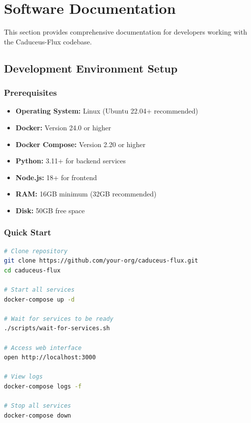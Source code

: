 \documentclass[10pt,a4paper]{article}
\begin{document}
\section{Software Documentation}

This section provides comprehensive documentation for developers working with the Caduceus-Flux codebase.

\subsection{Development Environment Setup}

\subsubsection{Prerequisites}
\begin{itemize}
\item \textbf{Operating System:} Linux (Ubuntu 22.04+ recommended)
\item \textbf{Docker:} Version 24.0 or higher
\item \textbf{Docker Compose:} Version 2.20 or higher
\item \textbf{Python:} 3.11+ for backend services
\item \textbf{Node.js:} 18+ for frontend
\item \textbf{RAM:} 16GB minimum (32GB recommended)
\item \textbf{Disk:} 50GB free space
\end{itemize}

\subsubsection{Quick Start}

\begin{lstlisting}[language=bash, caption=Development Setup]
# Clone repository
git clone https://github.com/your-org/caduceus-flux.git
cd caduceus-flux

# Start all services
docker-compose up -d

# Wait for services to be ready
./scripts/wait-for-services.sh

# Access web interface
open http://localhost:3000

# View logs
docker-compose logs -f

# Stop all services
docker-compose down
\end{lstlisting}
\end{document}
